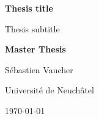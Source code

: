 \documentclass[10pt,a4paper,parskip=half,conference]{IEEEtran}
\author{\IEEEauthorblockN{\myauthor}
    \IEEEauthorblockA{Université de Neuchâtel\\
        Neuchâtel, Switzerland\\
        \href{mailto:sebastien.vaucher@unine.ch}{sebastien.vaucher@unine.ch}}
}
\title{\mytitle}
\def\thesistitle{Thesis title}
\def\thesissubtitle{Thesis subtitle}
\def\myauthor{Sébastien Vaucher}
\begin{document}
\begin{titlepage}
    \begin{otherlanguage}{australian}
        \begin{center}
            \begin{figure}[t]
                \vspace{0.4in}
            \end{figure}

            {\bfseries\Huge \thesistitle \par
                \Large \vspace{0.1in} \thesissubtitle \par}

            \vspace{0.3in}
            \LARGE{\textbf{Master Thesis} \\}
            \vspace{0.4in}

            {\Large \myauthor}

            \vspace{0.3in}
            {\Large Université de Neuchâtel \par}
            \vfill
            {\Large \today \par}

            \vspace{0.9in}


\end{center}
\end{otherlanguage}
\end{titlepage}
\end{document}
